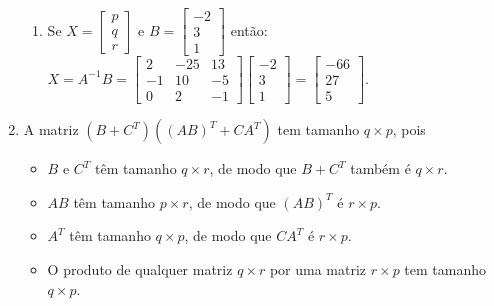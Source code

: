 \documentclass[12pt,a4paper]{article}
\begin{document}
\begin{enumerate}
\begin{enumerate}
\item Se $X = \begin{bmatrix}
p\\
q\\
r
\end{bmatrix}$ e $B = \begin{bmatrix}
-2\\
3\\
1
\end{bmatrix}$ então:
$
X
= A^{-1} B
=
\begin{bmatrix}
 2 & -25 & 13\\
-1 &  10 & -5\\
 0 & 2 & -1
\end{bmatrix}
\begin{bmatrix}
-2\\
3\\
1
\end{bmatrix}
=
\begin{bmatrix}
-66\\
27\\
5
\end{bmatrix}.
$
\end{enumerate}

\item A matriz $(B + C^T) ((AB)^T + CA^T)$ tem tamanho $q \times p$, pois
\begin{itemize}
\item $B$ e $C^T$ têm tamanho $q \times r$, de modo que $B + C^T$ também é $q \times r$.
\item $AB$ têm tamanho $p \times r$, de modo que $(AB)^T$ é $r \times p$.
\item $A^T$ têm tamanho $q \times p$, de modo que $CA^T$ é $r \times p$.
\item O produto de qualquer matriz $q \times r$ por uma matriz $r \times p$ tem tamanho $q \times p$.
\end{itemize}


\end{enumerate}
\end{document}

